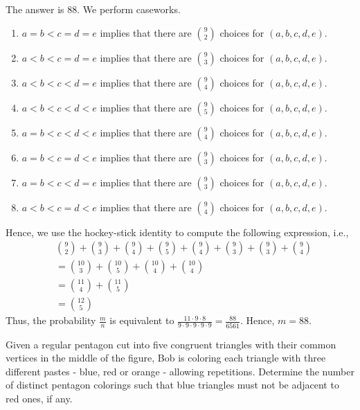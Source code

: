 \begin{solution}
The answer is $88$. We perform caseworks.
\begin{enumerate}
	\item $a=b<c=d=e$ implies that there are $\binom{9}{2}$ choices for $(a,b,c,d,e)$.
	\item $a<b<c=d=e$ implies that there are $\binom{9}{3}$ choices for $(a,b,c,d,e)$.
	\item $a<b<c<d=e$ implies that there are $\binom{9}{4}$ choices for $(a,b,c,d,e)$.
	\item $a<b<c<d<e$ implies that there are $\binom{9}{5}$ choices for $(a,b,c,d,e)$.
	\item $a=b<c<d<e$ implies that there are $\binom{9}{4}$ choices for $(a,b,c,d,e)$.
	\item $a=b<c=d<e$ implies that there are $\binom{9}{3}$ choices for $(a,b,c,d,e)$.
	\item $a=b<c<d=e$ implies that there are $\binom{9}{3}$ choices for $(a,b,c,d,e)$.
	\item $a<b<c=d<e$ implies that there are $\binom{9}{4}$ choices for $(a,b,c,d,e)$.
\end{enumerate}
Hence, we use the hockey-stick identity to compute the following expression, i.e.,
\begin{align*}
	&\binom92+\binom93+\binom94+\binom95+\binom94+\binom93+\binom93+\binom94\\
	&= \binom{10}{3}+\binom{10}{5}+\binom{10}{4}+\binom{10}{4}\\
	&=\binom{11}{4}+\binom{11}{5}\\
	&=\binom{12}{5}
\end{align*}
Thus, the probability $\frac{m}{n}$ is equivalent to $\frac{11\cdot9\cdot8}{9\cdot9\cdot9\cdot9\cdot9}=\frac{88}{6561}$. Hence, $m=88$.
\end{solution}

\begin{problem}
Given a regular pentagon cut into five congruent triangles with their common vertices in the middle of the figure, Bob is coloring each triangle with three different pastes - blue, red or orange - allowing repetitions. Determine the number of distinct pentagon colorings such that blue triangles must not be adjacent to red ones, if any.
\end{problem}

